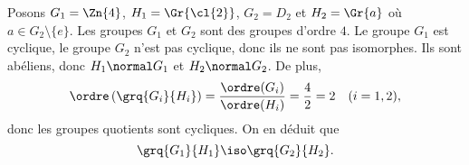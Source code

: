 Posons $G_1 = \Zn{4}$, $H_1 = \Gr{\cl{2}}$, $G_2 = D_2$ et $H_2 = \Gr{a}$ où
$a\in G_2\setminus\{e\}$. Les groupes $G_1$ et $G_2$ sont des groupes d'ordre
$4$. Le groupe $G_1$ est cyclique, le groupe $G_2$ n'est pas cyclique, donc ils
ne sont pas isomorphes. Ils sont abéliens, donc $H_1 \normal G_1$ et $H_2
\normal G_2$. De plus,
\[
  \ordre\left(\grq{G_i}{H_i}\right)
  = \frac{\ordre(G_i)}{\ordre(H_i)}
  = \frac{4}{2}
  = 2\quad (i=1,2),
\]
donc les groupes quotients sont cycliques. On en déduit que
\[
  \grq{G_1}{H_1} \iso \grq{G_2}{H_2}.
\]
